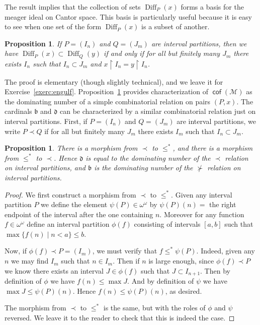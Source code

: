 \documentclass[11pt,oneside]{amsbook}
\newcommand{\Meager}{\mathcal M}
\DeclareMathOperator{\cof}{\mathsf{cof}}
\DeclareMathOperator{\Diff}{Diff}
\theoremstyle{definition}
\theoremstyle{plain}
\newtheorem{prop}[thm]{Proposition}
\theoremstyle{definition}
\theoremstyle{remark}
\begin{document}
The result implies that the collection of sets $\Diff_P(x)$ forms a basis for the meager ideal on Cantor space. This basis is particularly useful because it is easy to see when one set of the form $\Diff_P(x)$ is a subset of another.

\begin{prop}
  \label{prop:engulf}
  If $P=(I_n)$ and $Q=(J_m)$ are interval partitions, then we have $\Diff_P(x)\subset\Diff_Q(y)$ if and only if for all but finitely many $J_m$ there exists $I_n$ such that $I_n\subset J_m$ and $x\restriction I_n=y\restriction I_n$.
\end{prop}

The proof is elementary (though slightly technical), and we leave it for Exercise~\ref{exerc:engulf}. Proposition~\ref{prop:engulf} provides characterization of $\cof(\Meager)$ as the dominating number of a simple combinatorial relation on pairs $(P,x)$. The cardinals $\mathfrak b$ and $\mathfrak d$ can be characterized by a similar combinatorial relation just on interval partitions. First, if $P=(I_n)$ and $Q=(J_m)$ are interval partitions, we write $P\prec Q$ if for all but finitely many $J_m$ there exists $I_m$ such that $I_n\subset J_m$. 

\begin{prop}
  There is a morphism from $\prec$ to $\leq^*$, and there is a morphism from $\leq^*$ to $\prec$. Hence $\mathfrak d$ is equal to the dominating number of the $\prec$ relation on interval partitions, and $\mathfrak b$ is the dominating number of the $\not\succ$ relation on interval partitions.
\end{prop}

\begin{proof}
  We first construct a morphism from $\prec$ to $\leq^*$. Given any interval partition $P$ we define the element $\psi(P)\in\omega^\omega$ by $\psi(P)(n)=$ the right endpoint of the interval after the one containing $n$. Moreover for any function $f\in\omega^\omega$ define an interval partition $\phi(f)$ consisting of intervals $[a,b]$ such that $\max\{f(n)\mid n<a\}\leq b$.

  Now, if $\phi(f)\prec P=(I_m)$, we must verify that $f\leq^*\psi(P)$. Indeed, given any $n$ we may find $I_m$ such that $n\in I_m$. Then if $n$ is large enough, since $\phi(f)\prec P$ we know there exists an interval $J\in\phi(f)$ such that $J\subset I_{n+1}$. Then by definition of $\phi$ we have $f(n)\leq\max J$. And by definition of $\psi$ we have $\max J\leq\psi(P)(n)$. Hence $f(n)\leq\psi(P)(n)$, as desired.

  The morphism from $\prec$ to $\leq^*$ is the same, but with the roles of $\phi$ and $\psi$ reversed. We leave it to the reader to check that this is indeed the case.
\end{proof}
\end{document}
